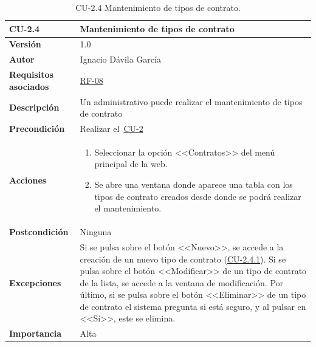 \begin{table}[p]
\label{table:CU-2.4}
	\centering
	\begin{tabularx}{\linewidth}{ p{} p{} }
		\toprule
		\textbf{CU-2.4}    & \textbf{Mantenimiento de tipos de contrato}\\
		\toprule
		\textbf{Versión}              & 1.0    \\
		\textbf{Autor}                & Ignacio Dávila García \\
		\textbf{Requisitos asociados} & \hyperref[itm:RF8]{RF-08} \\
		\textbf{Descripción}          & Un administrativo puede realizar el mantenimiento de tipos de contrato \\
		\textbf{Precondición}         & Realizar el~\hyperref[table:CU-2]{CU-2} \\
		\textbf{Acciones}             &
		\begin{enumerate}
			\def\labelenumi{\arabic{enumi}.}
			\tightlist
			\item Seleccionar la opción <<Contratos>> del menú principal de la web.
			\item Se abre una ventana donde aparece una tabla con los tipos de contrato creados desde donde se podrá realizar el mantenimiento.
		\end{enumerate}\\
		\textbf{Postcondición}        & Ninguna \\
		\textbf{Excepciones}          & Si se pulsa sobre el botón <<Nuevo>>, se accede a la creación de un nuevo tipo de contrato (\hyperref[table:CU-2.4.1]{CU-2.4.1}). Si se pulsa sobre el botón <<Modificar>> de un tipo de contrato de la lista, se accede a la ventana de modificación. Por último, si se pulsa sobre el botón <<Eliminar>> de un tipo de contrato el sistema pregunta si está seguro, y al pulsar en <<Sí>>, este se elimina. \\
		\textbf{Importancia}          & Alta \\
		\bottomrule
	\end{tabularx}
	\caption{CU-2.4 Mantenimiento de tipos de contrato.}
\end{table}
\FloatBarrier


